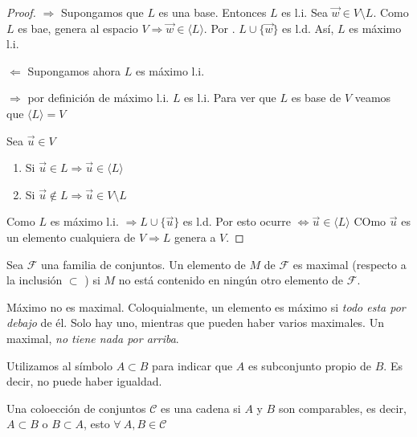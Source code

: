 \begin{proof}
    $\Rightarrow$ Supongamos que $L$ es una base. Entonces $L$ es l.i. Sea $\vec{w} \in V \setminus L$. Como $L$ es bae, genera al espacio $V \Rightarrow \vec{w} \in \langle L \rangle$. Por . $L \cup \{ \vec{w} \}$ es l.d. Así, $L$ es máximo l.i.

    $\Leftarrow$ Supongamos ahora $L$ es máximo l.i. 

    $\Rightarrow$ por definición de máximo l.i. $L$ es l.i. Para ver que $L$ es base de $V$ veamos que $\langle L \rangle = V$

    Sea $\vec{u} \in V$

    \begin{enumerate}
        \item Si $\vec{u} \in L \Rightarrow \vec{u} \in \langle L \rangle$
        \item Si $\vec{u} \notin L \Rightarrow \vec{u} \in V \setminus L$
    \end{enumerate}

    Como $L$ es máximo l.i. $\Rightarrow L \cup \{ \vec{u} \}$ es l.d. Por  esto ocurre $\iff \vec{u} \in \langle L \rangle$ COmo $\vec{u}$ es un elemento cualquiera de $V \Rightarrow L$ genera a $V$.
\end{proof}

\begin{definition}[Maximal]
    Sea $\mathcal{F}$ una familia de conjuntos. Un elemento de $M$ de $\mathcal{F}$ es maximal (respecto a la inclusión $\subset$ ) si $M$ no está contenido en ningún otro elemento de $\mathcal{F}$.
\end{definition}

\begin{remark}
    Máximo no es maximal. Coloquialmente, un elemento es máximo si \textit{todo esta por debajo} de él. Solo hay uno, mientras que pueden haber varios maximales. Un maximal, \textit{no tiene nada por arriba}.
\end{remark}

\begin{notation}
    Utilizamos al símbolo $A \subset B$ para indicar que $A$ es subconjunto propio de $B$. Es decir, no puede haber igualdad.
\end{notation}

\begin{definition}
    Una coloección de conjuntos $\mathscr{C}$ es una cadena si $A$ y $B$ son comparables, es decir, $A \subset B$ o $B \subset A$, esto $\forall \: A,B \in \mathscr{C}$
\end{definition}

